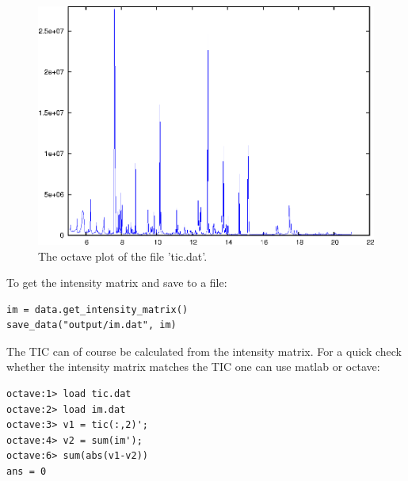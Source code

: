 \begin{figure}[htp]
\begin{center}
\includegraphics{graphics/tic.eps}
\caption{The octave plot of the file 'tic.dat'.}
\label{ticplot}
\end{center}
\end{figure}

To get the intensity matrix and save to a file:

\begin{verbatim}
im = data.get_intensity_matrix()
save_data("output/im.dat", im)
\end{verbatim}

The TIC can of course be calculated from the intensity matrix. For a quick
check whether the intensity matrix matches the TIC one can use matlab or
octave:

\begin{verbatim}
octave:1> load tic.dat
octave:2> load im.dat
octave:3> v1 = tic(:,2)';
octave:4> v2 = sum(im');
octave:6> sum(abs(v1-v2))
ans = 0
\end{verbatim}

